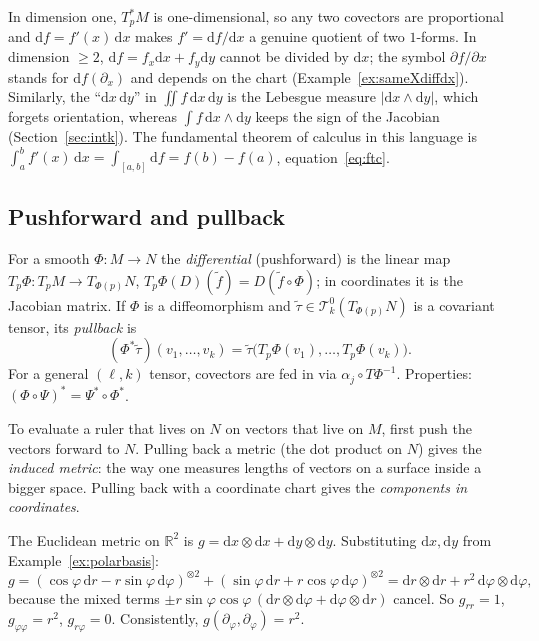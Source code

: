 \documentclass[11pt,a4paper]{article}
\numberwithin{equation}{section}
\theoremstyle{definition}
\theoremstyle{plain}
\newcommand{\R}{\mathbb{R}}
\newcommand{\dd}{\mathrm{d}}
\newcommand{\TT}[2]{\mathcal{T}^{#1}_{#2}}          %
\begin{document}
\begin{specialcase}
In dimension one, $T^*_pM$ is one-dimensional, so any two covectors are proportional and $\dd f=f'(x)\,\dd x$ makes $f'=\dd f/\dd x$ a genuine quotient of two $1$-forms.
In dimension $\ge2$, $\dd f=f_x\dd x+f_y\dd y$ cannot be divided by $\dd x$; the symbol $\partial f/\partial x$ stands for $\dd f(\partial_x)$ and depends on the chart (Example~\ref{ex:sameXdiffdx}).
Similarly, the ``$\dd x\,\dd y$'' in $\iint f\,\dd x\,\dd y$ is the Lebesgue measure $|\dd x\wedge\dd y|$, which forgets orientation, whereas $\int f\,\dd x\wedge\dd y$ keeps the sign of the Jacobian (Section~\ref{sec:intk}).
The fundamental theorem of calculus in this language is $\int_a^bf'(x)\,\dd x=\int_{[a,b]}\dd f=f(b)-f(a)$, equation~\eqref{eq:ftc}.
\end{specialcase}

\subsection{Pushforward and pullback}\label{sec:pushpull}
\begin{formal}
For a smooth $\Phi:M\to N$ the \emph{differential} (pushforward) is the linear map $T_p\Phi:T_pM\to T_{\Phi(p)}N$, $T_p\Phi(D)(\tilde f)=D(\tilde f\circ\Phi)$; in coordinates it is the Jacobian matrix. If $\Phi$ is a diffeomorphism and $\tilde\tau\in\TT{0}{k}(T_{\Phi(p)}N)$ is a covariant tensor, its \emph{pullback} is
\[
(\Phi^*\tilde\tau)(v_1,\dots,v_k)=\tilde\tau\big(T_p\Phi(v_1),\dots,T_p\Phi(v_k)\big).
\]
For a general $(\ell,k)$ tensor, covectors are fed in via $\alpha_j\circ T\Phi^{-1}$. Properties: $(\Phi\circ\Psi)^*=\Psi^*\circ\Phi^*$.
\end{formal}
\begin{intuition}[{pullback = ``transport the measuring device backwards''}]
To evaluate a ruler that lives on $N$ on vectors that live on $M$, first push the vectors forward to $N$. Pulling back a metric (the dot product on $N$) gives the \emph{induced metric}: the way one measures lengths of vectors on a surface inside a bigger space. Pulling back with a coordinate chart gives the \emph{components in coordinates}.
\end{intuition}

\begin{example}\label{ex:polarmetric}
The Euclidean metric on $\R^2$ is $g=\dd x\otimes\dd x+\dd y\otimes\dd y$. Substituting $\dd x,\dd y$ from Example~\ref{ex:polarbasis}:
\[
g=(\cos\varphi\,\dd r-r\sin\varphi\,\dd\varphi)^{\otimes2}+(\sin\varphi\,\dd r+r\cos\varphi\,\dd\varphi)^{\otimes2}
=\dd r\otimes\dd r+r^2\,\dd\varphi\otimes\dd\varphi ,
\]
because the mixed terms $\pm r\sin\varphi\cos\varphi\,(\dd r\otimes\dd\varphi+\dd\varphi\otimes\dd r)$ cancel. So $g_{rr}=1$, $g_{\varphi\varphi}=r^2$, $g_{r\varphi}=0$. Consistently, $g(\partial_\varphi,\partial_\varphi)=r^2$.
\end{example}
\end{document}
